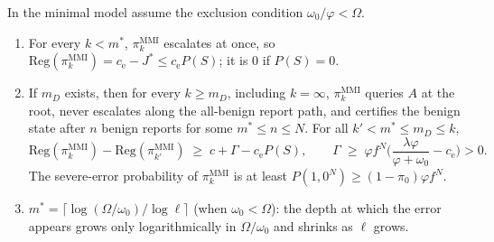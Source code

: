 \begin{theorem}\label{thm:depth}
In the minimal model assume the exclusion condition $\omega_0/\varphi<\Omega$.
\begin{enumerate}
\item[(i)] For every $k<m^*$, $\pi^{\mathrm{MMI}}_k$ escalates at once, so
$\mathrm{Reg}(\pi^{\mathrm{MMI}}_k)=c_{\mathrm e}-J^*\le c_{\mathrm e}P(S)$; it is $0$ if $P(S)=0$.
\item[(ii)] If $m_D$ exists, then for every $k\ge m_D$, including $k=\infty$, $\pi^{\mathrm{MMI}}_k$ queries $A$ at the root,
never escalates along the all-benign report path, and certifies the benign state after $n$ benign reports for some
$m^*\le n\le N$. For all $k'<m^*\le m_D\le k$,
\[
\mathrm{Reg}(\pi^{\mathrm{MMI}}_k)-\mathrm{Reg}(\pi^{\mathrm{MMI}}_{k'})\;\ge\;c+\Gamma-c_{\mathrm e}P(S),
\qquad
\Gamma\;\ge\;\varphi f^N\Big(\frac{\lambda\varphi}{\varphi+\omega_0}-c_{\mathrm e}\Big)>0 .
\]
The severe-error probability of $\pi^{\mathrm{MMI}}_k$ is at least $P(1,0^N)\ge(1-\pi_0)\varphi f^N$.
\item[(iii)] $m^*=\big\lceil\log(\Omega/\omega_0)/\log\ell\big\rceil$ (when $\omega_0<\Omega$): the depth at which the error
appears grows only logarithmically in $\Omega/\omega_0$ and shrinks as $\ell$ grows.
\end{enumerate}
\end{theorem}
